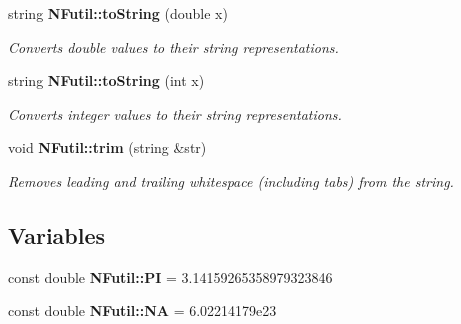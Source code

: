 \begin{CompactItemize}
string {\bf NFutil::toString} (double x)
\begin{CompactList}\small\item\em Converts double values to their string representations. \item\end{CompactList}\item 
string {\bf NFutil::toString} (int x)
\begin{CompactList}\small\item\em Converts integer values to their string representations. \item\end{CompactList}\item 
void {\bf NFutil::trim} (string \&str)
\begin{CompactList}\small\item\em Removes leading and trailing whitespace (including tabs) from the string. \item\end{CompactList}\end{CompactItemize}
\subsection*{Variables}
\begin{CompactItemize}
\item 
const double {\bf NFutil::PI} = 3.14159265358979323846
\item 
const double {\bf NFutil::NA} = 6.02214179e23
\end{CompactItemize}
